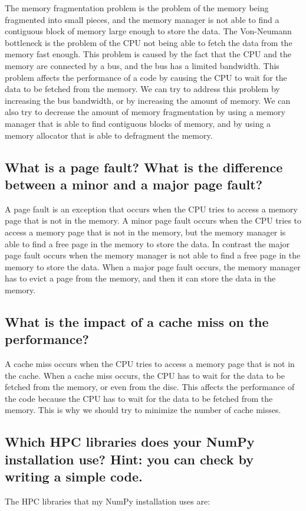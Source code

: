 \documentclass{article}
\begin{document}
The memory fragmentation problem is the problem of the memory being fragmented into small pieces, and the memory manager is not able to find a contiguous block of memory large enough to store the data. 
The Von-Neumann bottleneck is the problem of the CPU not being able to fetch the data from the memory fast enough. 
This problem is caused by the fact that the CPU and the memory are connected by a bus, and the bus has a limited bandwidth. 
This problem affects the performance of a code by causing the CPU to wait for the data to be fetched from the memory. 
We can try to address this problem by increasing the bus bandwidth, or by increasing the amount of memory. 
We can also try to decrease the amount of memory fragmentation by using a memory manager that is able to find contiguous blocks of memory, and by using a memory allocator that is able to defragment the memory.


\subsection{What is a page fault? What is the difference between a minor and a major page fault?}

A page fault is an exception that occurs when the CPU tries to access a memory page that is not in the memory.
A minor page fault occurs when the CPU tries to access a memory page that is not in the memory, but the memory manager is able to find a free page in the memory to store the data. 
In contrast the major page fault occurs when the memory manager is not able to find a free page in the memory to store the data.
When a major page fault occurs, the memory manager has to evict a page from the memory, and then it can store the data in the memory.


\subsection{What is the impact of a cache miss on the performance?}

A cache miss occurs when the CPU tries to access a memory page that is not in the cache. 
When a cache miss occurs, the CPU has to wait for the data to be fetched from the memory, or even from the disc. 
This affects the performance of the code because the CPU has to wait for the data to be fetched from the memory. 
This is why we should try to minimize the number of cache misses.


\subsection{Which HPC libraries does your NumPy installation use? Hint: you can check by writing a simple code.}
The HPC libraries that my NumPy installation uses are:
\end{document}
